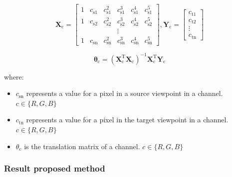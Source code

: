 

\begin{equation}
\mathbf{X}_{\mathrm{c}}=\left[\begin{array}{cccccc}
{1} & {c_{\mathrm{s} 1}} & {c_{\mathrm{s} 1}^{2}} & {c_{\mathrm{s} 1}^{3}} & {c_{\mathrm{s} 1}^{4}} & {c_{\mathrm{s} 1}^{5}} \\
{1} & {c_{\mathrm{s} 2}} & {c_{\mathrm{s} 2}^{2}} & {c_{\mathrm{s} 2}^{3}} & {c_{\mathrm{s} 2}^{4}} & {c_{\mathrm{s} 2}^{5}} \\
{} & {} & {} & {\vdots} & {} \\
{1} & {c_{\mathrm{sn}}} & {c_{\mathrm{sn}}^{2}} & {c_{\mathrm{sn}}^{3}} & {c_{\mathrm{sn}}^{4}} & {c_{\mathrm{sn}}^{5}}
\end{array}\right], \mathbf{Y}_{\mathrm{c}}=\left[\begin{array}{c}
{c_\mathrm{t1}} \\
{c_\mathrm{t2}} \\
{\vdots} \\
{c_\mathrm{tn}}
\end{array}\right]
\label{equation:pol_reg_2015}
\end{equation}

\begin{equation}
\boldsymbol{\theta}_{\mathrm{c}}=\left(\mathbf{X}_{\mathrm{c}}^{\mathrm{T}} \mathbf{X}_{\mathrm{c}}\right)^{-1} \mathbf{X}_{\mathrm{c}}^{\mathrm{T}} \mathbf{Y}_{\mathrm{c}}
\label{equation:pol_reg_2015_theta}
\end{equation}

where:

\begin{itemize}
\item $c_\mathrm{sn}$ represents a value for a pixel in a source viewpoint in a channel. $c \in\{R, G, B\}$
\item $c_\mathrm{tn}$ represents a value for a pixel in the target viewpoint in a channel. $c \in\{R, G, B\}$
\item $\theta_{\mathrm{c}}$ is the translation matrix of a channel. $c \in\{R, G, B\}$
\end{itemize}


\subsubsection{Result proposed method}

